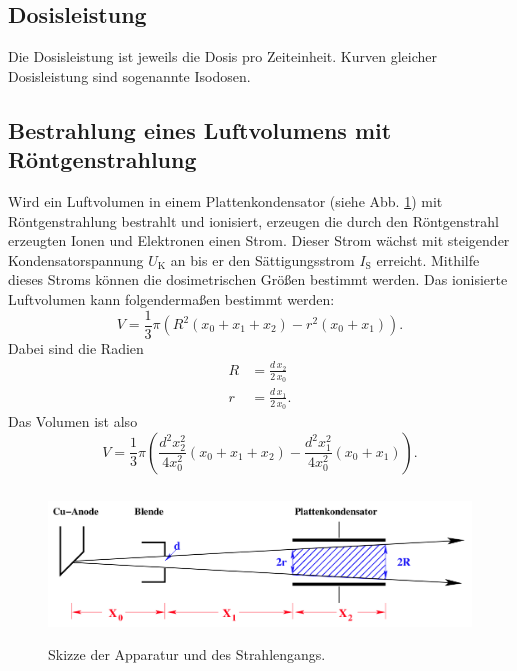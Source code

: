 \subsection{Dosisleistung}
Die Dosisleistung ist jeweils die Dosis pro Zeiteinheit.
Kurven gleicher Dosisleistung sind sogenannte Isodosen.

\subsection{Bestrahlung eines Luftvolumens mit Röntgenstrahlung}
Wird ein Luftvolumen in einem Plattenkondensator
(siehe Abb. \ref{fig:Strahlgeometrie}) mit
Röntgenstrahlung bestrahlt und ionisiert, erzeugen die durch
den Röntgenstrahl erzeugten Ionen und Elektronen einen Strom.
Dieser Strom wächst mit steigender Kondensatorspannung 
$U_\text{K}$ an bis er den Sättigungsstrom $I_\text{S}$
erreicht. Mithilfe dieses Stroms können die dosimetrischen
Größen bestimmt werden.
\newline
Das ionisierte Luftvolumen kann folgendermaßen bestimmt werden:
\begin{equation*}
    V = \frac{1}{3} \pi (R^2 (x_0 + x_1 + x_2) - r^2 (x_0 + x_1)). 
\end{equation*}
Dabei sind die Radien
\begin{align*}
    R &= \frac{d \, x_2}{2 \, x_0} \\
    r &= \frac{d \, x_1}{2 \, x_0}. 
\end{align*}
Das Volumen ist also 
\begin{equation}
    V = \frac{1}{3} \pi \left(\frac{d^2 x_2^2}{4 x_0^2}(x_0 + x_1 + x_2) - \frac{d^2 x_1^2}{4 x_0^2}(x_0 + x_1)\right).
    \label{eqn:V}
\end{equation}

\begin{figure}
    \centering
    \includegraphics[width=12cm, height=4cm]{build/strahl.png}
    \caption{Skizze der Apparatur und des Strahlengangs. \cite{V607}}
    \label{fig:Strahlgeometrie}
\end{figure}